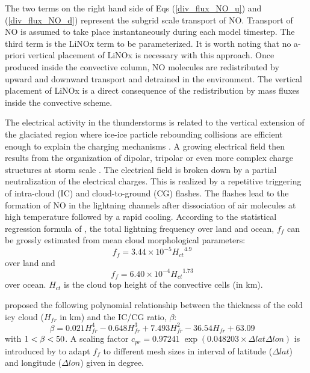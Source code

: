%
The two terms on the right hand side of 
Eqs (\ref{div_flux_NO_u}) and (\ref{div_flux_NO_d})
represent the subgrid scale
transport of NO.
Transport of NO 
is assumed to take place instantaneously during each model timestep. 
The third term is the LiNOx term to be parameterized.
It is worth noting that 
no a-priori vertical placement of LiNOx is necessary with this approach.
Once produced inside the convective column, NO molecules are redistributed 
by upward and downward transport and detrained in the environment. The 
vertical placement of LiNOx is a direct consequence of the redistribution by 
mass fluxes inside the convective scheme. 

The electrical activity in the thunderstorms is related to the vertical 
extension of the glaciated region where ice-ice particle rebounding collisions 
are efficient enough to explain the charging mechanisms 
\citep{Reynolds1957,Takahashi1978,Saunders1992}. 
A growing electrical 
field then results from the organization of dipolar, tripolar or even 
more complex charge 
structures at storm scale \citep{Rust2002,Rust1996,Stolzenburg2002,Barthe2005}. 
The electrical field is broken down by a partial 
neutralization of the electrical charges. This is realized by a repetitive 
triggering of intra-cloud (IC) and cloud-to-ground (CG) flashes. The flashes 
lead to the formation of NO in the lightning channels after dissociation
of air molecules at high temperature followed by a rapid cooling. 
According to 
the statistical regression formula of \citet{Price1992}, 
the total lightning
frequency over land and ocean, $f_f$ can be grossly estimated from 
mean cloud morphological parameters: 
%
\begin{equation} \label{eqn : frequence}
f_f=3.44 \times 10^{-5}{H_{ct}}^{4.9} \quad
\end{equation}
over land and 
\begin{equation} \label{eqn : frequence2}
f_f=6.40 \times 10^{-4}{H_{ct}}^{1.73} \quad
\end{equation}
over ocean.
$H_{ct}$ is the cloud top height of the convective cells (in km).

\citet{Price1993} proposed the following polynomial relationship
between the thickness of the cold icy cloud ($H_{fr}$ in km) and the 
IC/CG ratio, $\beta$:
\begin{equation} \label{eqn : rapport}
\beta =0.021H_{fr}^4-0.648H_{fr}^3+7.493H_{fr}^2-36.54H_{fr}+63.09 \quad
\end{equation}
with $\rm 1<\beta<50$.
%
A scaling factor 
$c_{pr}=0.97241 \; \exp(0.048203\times \Delta lat \Delta lon)$ is introduced 
by \citet{Price1994} to adapt $f_f$ to different mesh sizes in 
interval of latitude ($\Delta lat$) and longitude ($\Delta lon$) given in 
degree. 

